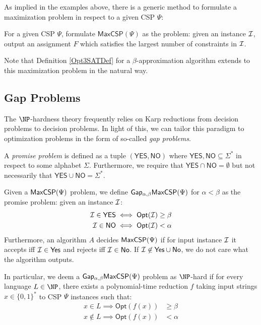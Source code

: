   As implied in the examples above, there is a generic method to formulate a maximization problem in respect to a given CSP $\Psi$:
  \begin{definition}
    For a given CSP $\Psi$, formulate $\mathsf{MaxCSP}(\Psi)$ as the problem: given an instance $\mathcal{I}$, output an assignment $F$ which satisfies the largest number of constraints in $\mathcal{I}$.
  \end{definition}

Note that Definition \ref{Opt3SATDef} for a $\beta$-approximation algorithm extends to this maximization problem in the natural way.

\subsection{Gap Problems}

The $\NP$-hardness theory frequently relies on Karp reductions from decision problems to decision problems. In light of this, we can tailor this paradigm to optimization problems in the form of so-called \emph{gap problems}.

\begin{definition} \label{promiseDef}
  A \emph{promise problem} is defined as a tuple $(\mathsf{YES}, \mathsf{NO})$ where $\mathsf{YES},\mathsf{NO} \subseteq \Sigma^*$ in respect to some alphabet $\Sigma$. Furthermore, we require that $\mathsf{YES} \cap \mathsf{NO} = \emptyset$ but not necessarily that $\mathsf{YES} \cup \mathsf{NO} = \Sigma^*$.
\end{definition}

\begin{definition} \label{gapDef}
  Given a $\mathsf{MaxCSP}(\Psi)$ problem, we define $\mathsf{Gap_{\alpha,\beta}}\mathsf{MaxCSP}(\Psi)$ for $\alpha < \beta$ as the promise problem: given an instance $\mathcal{I}$:
  \begin{align}
      \mathcal{I} \in \mathsf{YES} & \iff \mathsf{Opt}(\mathcal{I}) \geq \beta \\
        \mathcal{I} \in \mathsf{NO} & \iff \mathsf{Opt}(\mathcal{I}) < \alpha
  \end{align}
  Furthermore, an algorithm $A$ decides $\mathsf{MaxCSP}(\Psi)$ if for input instance $\mathcal{I}$ it accepts iff $\mathcal{I} \in \mathsf{Yes}$ and rejects iff $\mathcal{I} \in \mathsf{No}$. If $\mathcal{I} \not\in \mathsf{Yes} \cup \mathsf{No}$, we do not care what the algorithm outputs.
\end{definition}

In particular, we deem a $\mathsf{Gap_{\alpha,\beta}}\mathsf{MaxCSP}(\Psi)$ problem as $\NP$-hard if for every language $L \in \NP$, there exists a polynomial-time reduction $f$ taking input strings $x \in \{0,1\}^*$ to CSP $\Psi$ instances such that:
\begin{align*}
  x \in L \implies \mathsf{Opt}(f(x)) & \geq \beta \\
  x \not\in L \implies \mathsf{Opt}(f(x))&  < \alpha
\end{align*}

